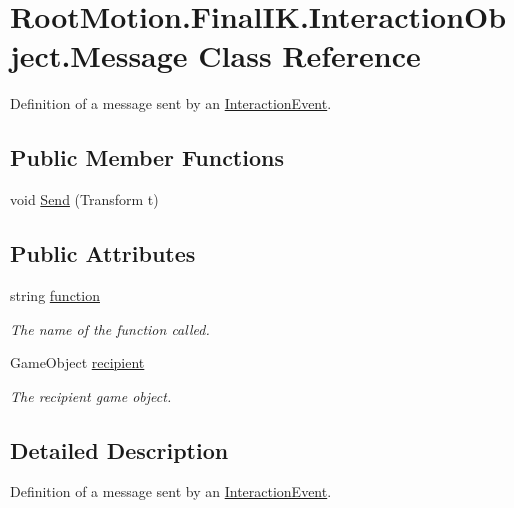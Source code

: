 \hypertarget{class_root_motion_1_1_final_i_k_1_1_interaction_object_1_1_message}{}\section{Root\+Motion.\+Final\+I\+K.\+Interaction\+Object.\+Message Class Reference}
\label{class_root_motion_1_1_final_i_k_1_1_interaction_object_1_1_message}


Definition of a message sent by an \mbox{\hyperlink{class_root_motion_1_1_final_i_k_1_1_interaction_object_1_1_interaction_event}{Interaction\+Event}}.  


\subsection*{Public Member Functions}
\begin{DoxyCompactItemize}
\item 
void \mbox{\hyperlink{class_root_motion_1_1_final_i_k_1_1_interaction_object_1_1_message_a762eab3126701e082295735df74695c9}{Send}} (Transform t)
\end{DoxyCompactItemize}
\subsection*{Public Attributes}
\begin{DoxyCompactItemize}
\item 
string \mbox{\hyperlink{class_root_motion_1_1_final_i_k_1_1_interaction_object_1_1_message_a2c11c4b83e8e0e909ab0b5e18a22979f}{function}}
\begin{DoxyCompactList}\small\item\em The name of the function called. \end{DoxyCompactList}\item 
Game\+Object \mbox{\hyperlink{class_root_motion_1_1_final_i_k_1_1_interaction_object_1_1_message_a15f7ede0dde603ad5ccaffbdd75e134c}{recipient}}
\begin{DoxyCompactList}\small\item\em The recipient game object. \end{DoxyCompactList}\end{DoxyCompactItemize}


\subsection{Detailed Description}
Definition of a message sent by an \mbox{\hyperlink{class_root_motion_1_1_final_i_k_1_1_interaction_object_1_1_interaction_event}{Interaction\+Event}}. 



